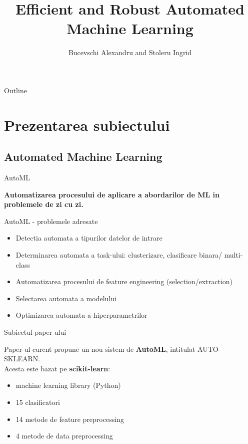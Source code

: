 \documentclass{beamer}
\title[Short Paper Title] %
{Efficient and Robust Automated Machine Learning}
\author[Author] %
{Bucevschi Alexandru\inst{1} and Stoleru Ingrid\inst{1}}
\institute[Universities of Somewhere and Elsewhere] %
{
  \inst{1}
  Facultatea de Informatica\\
  Universitatea "Alexandru Ioan Cuza"
}
\begin{document}
\begin{frame}
  \titlepage
\end{frame}

\begin{frame}{Outline}
  \tableofcontents
\end{frame}

\section{Prezentarea subiectului}

\subsection{Automated Machine Learning}
\begin{frame}{AutoML}
	\begin{center}
		\textbf{Automatizarea procesului de aplicare a abordarilor de ML in problemele de zi cu zi.}
	\end{center}
\end{frame}

\begin{frame}{AutoML - problemele adresate}
	\begin{center}
		\begin{itemize}
			\item Detectia automata a tipurilor datelor de intrare
			\item Determinarea automata a task-ului: clusterizare, clasificare binara/ multi-class
			\item Automatizarea procesului de feature engineering (selection/extraction)
			\item Selectarea automata a modelului
			\item Optimizarea automata a hiperparametrilor
		\end{itemize}
	\end{center}
\end{frame}


\begin{frame}{Subiectul paper-ului}
	\begin{center}
		Paper-ul curent propune un nou sistem de \textbf{AutoML}, intitulat AUTO-SKLEARN.\\
		\vspace{0.5cm}
		Acesta este bazat pe \textbf{scikit-learn}:
		\vspace{0.25cm}
		\begin{itemize}
			\item machine learning library (Python)
			\item 15 clasificatori
			\item 14 metode de feature preprocessing
			\item 4 metode de data preprocessing
		\end{itemize}
	\end{center}
\end{frame}
\end{document}

